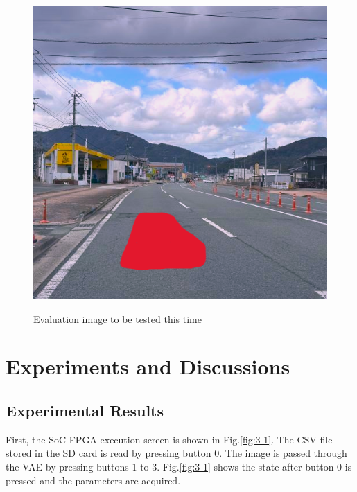 \documentclass[conference]{IEEEtran}
\begin{document}
\begin{figure}[tb]
\begin{minipage}[]{0.32\linewidth}
    \label{fig:2-3-3}
  \end{minipage}
  \begin{minipage}[]{0.32\linewidth}
    \centering
    \includegraphics[width=0.9\columnwidth]{figures/Ex_pr3.png}
    \label{fig:2-3-4}
  \end{minipage}
  \caption{Evaluation image to be tested this time}
  \label{fig:2-3-1}
\end{figure}

\section{Experiments and Discussions}
\subsection{Experimental Results}
First, the SoC FPGA execution screen is shown in Fig.\ref{fig:3-1}.
The CSV file stored in the SD card is read by pressing button 0.
The image is passed through the VAE by pressing buttons 1 to 3.
Fig.\ref{fig:3-1} shows the state after button 0 is pressed and the parameters are acquired.
\end{document}
